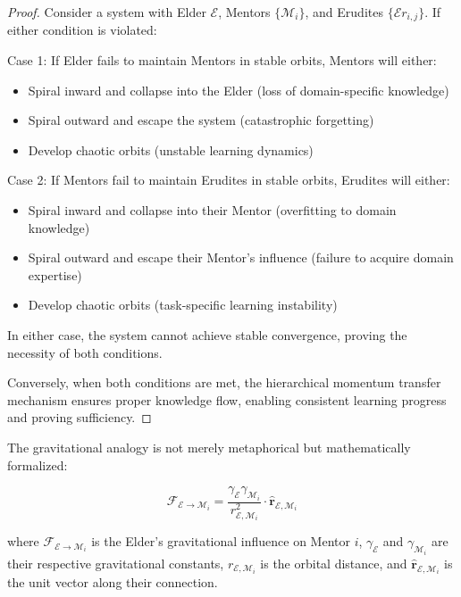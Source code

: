 \begin{proof}
Consider a system with Elder $\mathcal{E}$, Mentors $\{\mathcal{M}_i\}$, and Erudites $\{\mathcal{E}r_{i,j}\}$. If either condition is violated:

Case 1: If Elder fails to maintain Mentors in stable orbits, Mentors will either:
\begin{itemize}
    \item Spiral inward and collapse into the Elder (loss of domain-specific knowledge)
    \item Spiral outward and escape the system (catastrophic forgetting)
    \item Develop chaotic orbits (unstable learning dynamics)
\end{itemize}

Case 2: If Mentors fail to maintain Erudites in stable orbits, Erudites will either:
\begin{itemize}
    \item Spiral inward and collapse into their Mentor (overfitting to domain knowledge)
    \item Spiral outward and escape their Mentor's influence (failure to acquire domain expertise)
    \item Develop chaotic orbits (task-specific learning instability)
\end{itemize}

In either case, the system cannot achieve stable convergence, proving the necessity of both conditions.

Conversely, when both conditions are met, the hierarchical momentum transfer mechanism ensures proper knowledge flow, enabling consistent learning progress and proving sufficiency.
\end{proof}

The gravitational analogy is not merely metaphorical but mathematically formalized:

\begin{equation}
\mathcal{F}_{\mathcal{E} \rightarrow \mathcal{M}_i} = \frac{\gamma_{\mathcal{E}} \gamma_{\mathcal{M}_i}}{r_{\mathcal{E},\mathcal{M}_i}^2} \cdot \mathbf{\hat{r}}_{\mathcal{E},\mathcal{M}_i}
\end{equation}

where $\mathcal{F}_{\mathcal{E} \rightarrow \mathcal{M}_i}$ is the Elder's gravitational influence on Mentor $i$, $\gamma_{\mathcal{E}}$ and $\gamma_{\mathcal{M}_i}$ are their respective gravitational constants, $r_{\mathcal{E},\mathcal{M}_i}$ is the orbital distance, and $\mathbf{\hat{r}}_{\mathcal{E},\mathcal{M}_i}$ is the unit vector along their connection.

